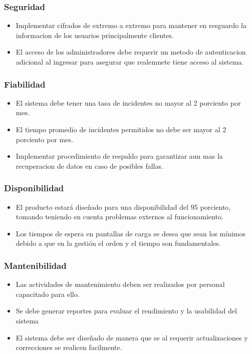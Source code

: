\documentclass[12pt,a4paper, twosite]{article}
\begin{document}
\subsubsection{Seguridad}
\begin{itemize}
\item Implementar cifrados de extremo a extremo para mantener en resguardo la informacion de los usuarios principalmente clientes.
\item El acceso de los administradores debe requerir un metodo de autenticacion adicional al ingresar para asegurar que realemnete tiene acceso al sistema. 
\end{itemize}

\subsubsection{Fiabilidad}
\begin{itemize}
\item El sistema debe tener una tasa de incidentes no mayor al 2 porciento por mes. 
\item El tiempo promedio de incidentes permitidos no debe ser mayor al 2 porciento por mes.
\item Implementar procedimiento de respaldo para garantizar aun mas la recuperacion de datos en caso de posibles fallas. 
\end{itemize}

\subsubsection{Disponibilidad}
\begin{itemize}
\item  El producto estará diseñado para una disponibilidad del 95 porciento, tomando teniendo en cuenta problemas externos al funcionamiento. 
\item Los tiempos de espera en pantallas de carga se desea que sean los mínimos debido a que en la gestión el orden y el tiempo son fundamentales.
\end{itemize}

\subsubsection{Mantenibilidad}
\begin{itemize}
\item Las actividades de mantenimiento deben ser realizados por personal capacitado para ello. 
\item Se debe generar reportes para evaluar el rendimiento y la usabilidad del sistema
\item El sistema debe ser diseñado de manera que se al requerir actualizaciones y correcciones se realicen facilmente. 
\end{itemize}
\end{document}
